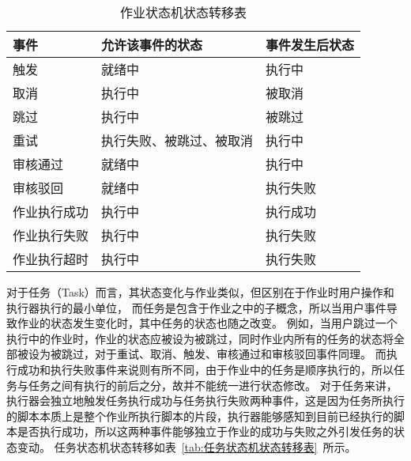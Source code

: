 \begin{table}[h]
  \centering
  \caption{作业状态机状态转移表}
  \label{tab:作业状态机状态转移表}
  \begin{tabular}{lll}
    \toprule
    事件           & 允许该事件的状态          & 事件发生后状态                  \\
    \midrule
    触发           & 就绪中                   & 执行中       \\
    取消           & 执行中                   & 被取消       \\
    跳过           & 执行中                   & 被跳过       \\
    重试           & 执行失败、被跳过、被取消   & 执行中       \\
    审核通过        & 就绪中                   & 执行中        \\
    审核驳回        & 就绪中                   & 执行失败       \\
    作业执行成功     & 执行中      & 执行成功   \\
    作业执行失败     & 执行中      & 执行失败   \\
    作业执行超时     & 执行中      & 执行失败   \\
    \bottomrule
  \end{tabular}
\end{table}

对于任务（Task）而言，其状态变化与作业类似，但区别在于作业时用户操作和执行器执行的最小单位，
而任务是包含于作业之中的子概念，所以当用户事件导致作业的状态发生变化时，其中任务的状态也随之改变。
例如，当用户跳过一个执行中的作业时，作业的状态应被设为被跳过，同时作业内所有的任务的状态将全部被设为被跳过，对于重试、取消、触发、审核通过和审核驳回事件同理。
而执行成功和执行失败事件来说则有所不同，由于作业中的任务是顺序执行的，所以任务与任务之间有执行的前后之分，故并不能统一进行状态修改。
对于任务来讲，执行器会独立地触发任务执行成功与任务执行失败两种事件，这是因为任务所执行的脚本本质上是整个作业所执行脚本的片段，执行器能够感知到目前已经执行的脚本是否执行成功，所以这两种事件能够独立于作业的成功与失败之外引发任务的状态变动。
任务状态机状态转移如表~\ref{tab:任务状态机状态转移表}~所示。

